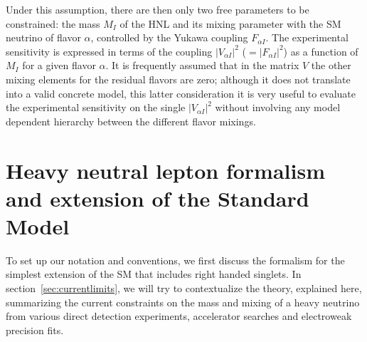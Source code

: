 Under this assumption, there are then only two free parameters to be
constrained: the mass $M_I$ of the HNL and its mixing parameter with
the SM neutrino of flavor $\alpha$, controlled by the Yukawa coupling
$F_{\alpha I}$. The experimental sensitivity is expressed in terms of
the coupling $|V_{\alpha I}|^2$ ($= |F_{\alpha I}|^2$) as a function
of $M_I$ for a given flavor $\alpha$. It is frequently assumed that in
the matrix $V$ the other mixing elements for the residual flavors are
zero; although it does not translate into a valid concrete model, this latter consideration it is very useful to evaluate the experimental sensitivity on the single $|V_{\alpha I}|^2$ without involving any model dependent hierarchy between the different flavor mixings. 

\section{Heavy neutral lepton formalism and extension of the Standard Model}
To set up our notation and conventions, we first discuss the formalism for the simplest
extension of the SM that includes right handed singlets. In section~\ref{sec:currentlimits}, we will try to contextualize the theory, explained here, summarizing the current constraints on the mass and mixing of a heavy neutrino from various direct
detection experiments, accelerator searches and electroweak precision
fits.

